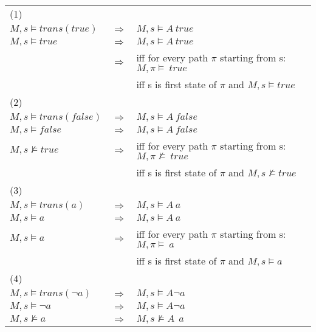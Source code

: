 \begin{tabular}{l l l}
\hline
\hline
(1) & & \\
$M,s\models trans(true)$ & $ \Rightarrow $ & $ M,s\models A\ true$ \\
$M,s\models true $ & $ \Rightarrow $ & $ M,s\models A\ true$ \\
 & $\Rightarrow$ & iff for every path $\pi$ starting from s: $M,\pi \models\ true$ \\
 & & iff s is first state of $\pi$ and $M,s\models true$ \\
\hline
\hline
(2) & & \\
$M,s\models trans(false)$ & $ \Rightarrow $ & $ M,s\models A\ false$ \\
$M,s\models false $ & $ \Rightarrow $ & $ M,s\models A\ false$ \\
$M,s\not\models true$ & $\Rightarrow$ & iff for every path $\pi$ starting from s: $M,\pi \not\models\ true$ \\
 & & iff s is first state of $\pi$ and $M,s\not\models true$ \\
\hline
\hline
(3) & & \\
$M,s\models trans(a)$ & $ \Rightarrow $ & $ M,s\models A\ a$ \\
$M,s\models a $ & $ \Rightarrow $ & $ M,s\models A\ a$ \\
$M,s\models a$ & $\Rightarrow$ & iff for every path $\pi$ starting from s: $M,\pi \models\ a$ \\
 & & iff s is first state of $\pi$ and $M,s\models a$ \\
\hline
\hline
(4) & & \\
$M,s\models trans(\neg a)$ & $ \Rightarrow $ & $ M,s\models A\neg a$ \\
$M,s\models \neg a $ & $ \Rightarrow $ & $ M,s\models A\neg a$ \\
$M,s\not\models a$ & $\Rightarrow$ & $M,s\not\models A\ \ a$ \\
\end{tabular}
\\


